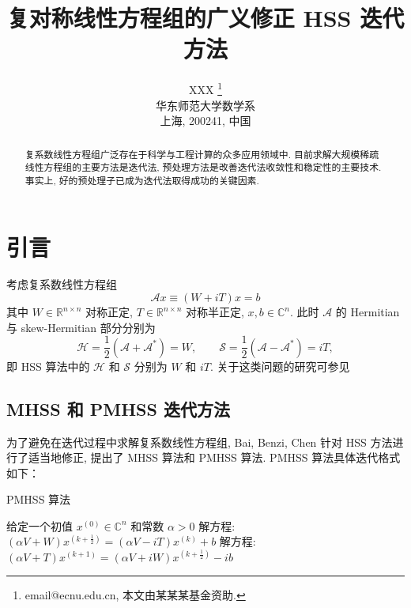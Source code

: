 \documentclass[UTF8]{ctexart}
\theoremstyle{plain}
\theoremstyle{nonumberplain}
\numberwithin{equation}{section} %
\renewcommand{\C}{\ensuremath{\mathbb{C}}}
\newcommand{\R}{\ensuremath{\mathbb{R}}}
\begin{document}
\title{复对称线性方程组的广义修正 HSS 迭代方法}

\author{XXX \thanks{email@ecnu.edu.cn, 本文由某某某基金资助.} \\[1em]
  华东师范大学数学系\\
  上海, 200241, 中国}

\date{}

\maketitle

\begin{abstract}
复系数线性方程组广泛存在于科学与工程计算的众多应用领域中.
目前求解大规模稀疏线性方程组的主要方法是迭代法,
预处理方法是改善迭代法收敛性和稳定性的主要技术.
事实上, 好的预处理子已成为迭代法取得成功的关键因素.
\end{abstract}

\section{引言}
考虑复系数线性方程组
\begin{equation}\label{eq:problem}
  \mathcal{A}x \equiv (W+iT)x=b
\end{equation}
其中 $W \in \R^{n \times n}$ 对称正定,
$T \in \R^{n \times n}$ 对称半正定, $x, b \in \C^{n}$.
此时 $\mathcal{A}$ 的 Hermitian 与 skew-Hermitian 部分分别为
$$
  \mathcal{H}=\frac12(\mathcal{A}+\mathcal{A}^{*})=W, \qquad \mathcal{S}=\frac12(\mathcal{A}-\mathcal{A}^{*})=iT,
$$
即 HSS \cite{BGN-03} 算法中的 $\mathcal{H}$ 和 $\mathcal{S}$ 分别为 $W$ 和 $iT$.
关于这类问题的研究可参见
\cite{BBC-10,BBC-11,NMP-84,VM-90}

\subsection{MHSS 和 PMHSS 迭代方法}
为了避免在迭代过程中求解复系数线性方程组,
Bai, Benzi, Chen 针对 HSS 方法进行了适当地修正,
提出了 MHSS \cite{BBC-10} 算法和 PMHSS \cite{BBC-11} 算法.
PMHSS 算法具体迭代格式如下：
\begin{algorithm}[H]
\caption{PMHSS 算法\label{Alg:PMHSS}}
\begin{algorithmic}[1]
  \State 给定一个初值 $ x^{(0)} \in \C^{n} $  和常数 $\alpha>0$
  \State 解方程: $(\alpha V+W)x^{(k+\frac{1}{2})}=(\alpha V-iT)x^{(k)}+b $
  \State 解方程: $(\alpha V+T)x^{(k+1)}=(\alpha V+iW)x^{(k+\frac{1}{2})}-ib$
  \EndFor
\end{algorithmic}
\end{algorithm}
\end{document}
